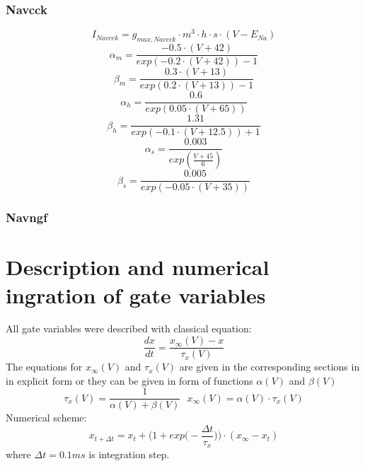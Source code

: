 \documentclass[12pt]{article}
\begin{document}
\subsubsection{Navcck}
\begin{equation}
I_{Navcck} = g_{max, Navcck} \cdot m^3 \cdot h \cdot s \cdot (V - E_{Na})
\end{equation}
\begin{equation}
\alpha_m = \frac{-0.5 \cdot (V + 42)}{exp(-0.2\cdot(V+42)) - 1}
\end{equation}
\begin{equation}
\beta_m = \frac{0.3 \cdot (V + 13)}{exp(0.2\cdot(V+13)) - 1}
\end{equation}
\begin{equation}
\alpha_h = \frac{0.6}{exp(0.05\cdot(V+65))}
\end{equation}
\begin{equation}
\beta_h = \frac{1.31}{exp(-0.1\cdot(V+12.5)) + 1}
\end{equation}
\begin{equation}
\alpha_s = \frac{0.003}{exp( \frac{V+45}{6})}
\end{equation}
\begin{equation}
\beta_s = \frac{0.005}{exp(-0.05\cdot(V+35))}
\end{equation}

\subsubsection{Navngf}



\section{Description and numerical ingration of gate variables}
All gate variables were described with classical equation: 
\begin{equation}
\frac{dx}{dt} = \frac{x_{\infty}(V) - x}{\tau_x(V)}
\end{equation}
The equations for $x_{\infty}(V)$ and $\tau_x(V)$ are given in the corresponding sections in in explicit form or they can be given in form of functions  $\alpha(V)$ and $\beta(V)$
\begin{equation}
\tau_x(V) =  \frac{1}{\alpha(V) + \beta(V)} \ \ \ 
x_{\infty}(V) = \alpha(V) \cdot \tau_x(V)
\end{equation}
Numerical scheme:
\begin{equation}
x_{t + \Delta t} = x_t+\Big(1 + exp \Big(-\frac{\Delta t}{\tau_x} \Big) \Big)\cdot (x_{\infty}-x_t) 
\end{equation}
where $\Delta t = 0.1 ms$ is integration step.
\end{document}
